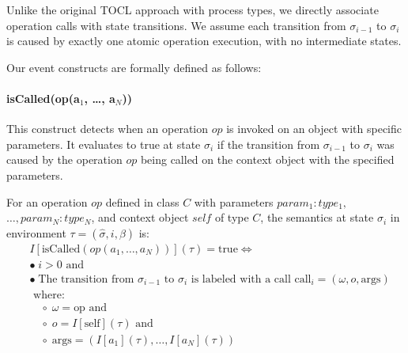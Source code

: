 Unlike the original TOCL approach with process types, we directly associate operation 
calls with state transitions. We assume each transition from 
$\sigma_{i-1}$ to $\sigma_i$ 
is caused by exactly one atomic operation execution, with no intermediate states.

Our event constructs are formally defined as follows:
\vspace{-1.5em}
\paragraph{isCalled(op(a$_1$, \ldots, a$_N$))}
This construct detects when an operation $op$ is invoked on an object with specific 
parameters. It evaluates to true at state $\sigma_i$ if the transition from 
$\sigma_{i-1}$ to $\sigma_i$ was caused by the operation $op$ being called on the 
context object with the specified parameters.

For an operation $op$ defined in class $C$ with parameters 
$param_1: type_1,$ $\ldots, param_N: type_N$, and context object $self$ of type $C$, 
the semantics at state $\sigma_i$ in environment $\tau = (\hat{\sigma}, i, \beta)$ 
is:
\begin{equation}
    \begin{split}
    & I[\text{isCalled}(op(a_1, \ldots, a_N))](\tau) = \text{true} \iff \\
    & \bullet\; i > 0 \text{ and} \\
    & \bullet\; \text{The transition from } \sigma_{i-1} \text{ to } \sigma_i \text{ is labeled with a call } \text{call}_i = (\omega, o, \text{args}) \\
    & \text{ where:} \\
    & \quad \circ\; \omega = \text{op} \text{ and} \\
    & \quad \circ\; o = I[\text{self}](\tau) \text{ and} \\
    & \quad \circ\; \text{args} = (I[a_1](\tau), \ldots, I[a_N](\tau))
    \end{split}
\end{equation}

